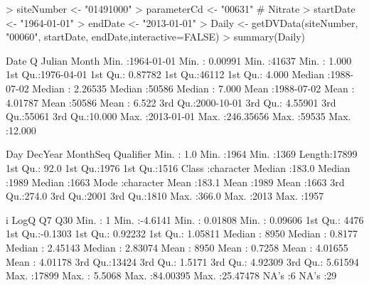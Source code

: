 \documentclass[a4paper,11pt]{article}
\begin{document}
\begin{Schunk}
\begin{Sinput}
> siteNumber <- "01491000"
> parameterCd <- "00631"  # Nitrate
> startDate <- "1964-01-01"
> endDate <- "2013-01-01"
> Daily <- getDVData(siteNumber, "00060", startDate, endDate,interactive=FALSE)
> summary(Daily)
\end{Sinput}
\begin{Soutput}
      Date                  Q                 Julian          Month       
 Min.   :1964-01-01   Min.   :  0.00991   Min.   :41637   Min.   : 1.000  
 1st Qu.:1976-04-01   1st Qu.:  0.87782   1st Qu.:46112   1st Qu.: 4.000  
 Median :1988-07-02   Median :  2.26535   Median :50586   Median : 7.000  
 Mean   :1988-07-02   Mean   :  4.01787   Mean   :50586   Mean   : 6.522  
 3rd Qu.:2000-10-01   3rd Qu.:  4.55901   3rd Qu.:55061   3rd Qu.:10.000  
 Max.   :2013-01-01   Max.   :246.35656   Max.   :59535   Max.   :12.000  
                                                                          
      Day           DecYear        MonthSeq     Qualifier        
 Min.   :  1.0   Min.   :1964   Min.   :1369   Length:17899      
 1st Qu.: 92.0   1st Qu.:1976   1st Qu.:1516   Class :character  
 Median :183.0   Median :1989   Median :1663   Mode  :character  
 Mean   :183.1   Mean   :1989   Mean   :1663                     
 3rd Qu.:274.0   3rd Qu.:2001   3rd Qu.:1810                     
 Max.   :366.0   Max.   :2013   Max.   :1957                     
                                                                 
       i              LogQ               Q7                Q30          
 Min.   :    1   Min.   :-4.6141   Min.   : 0.01808   Min.   : 0.09606  
 1st Qu.: 4476   1st Qu.:-0.1303   1st Qu.: 0.92232   1st Qu.: 1.05811  
 Median : 8950   Median : 0.8177   Median : 2.45143   Median : 2.83074  
 Mean   : 8950   Mean   : 0.7258   Mean   : 4.01655   Mean   : 4.01178  
 3rd Qu.:13424   3rd Qu.: 1.5171   3rd Qu.: 4.92309   3rd Qu.: 5.61594  
 Max.   :17899   Max.   : 5.5068   Max.   :84.00395   Max.   :25.47478  
                                   NA's   :6          NA's   :29        
\end{Soutput}
\end{Schunk}
\end{document}
